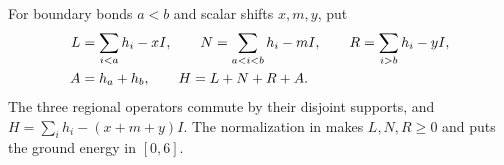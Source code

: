 \begin{definition}
    \label{def:aklv_normalized_cut_blocks}
    \leanok
    For boundary bonds $a<b$ and scalar shifts $x,m,y$, put
    \begin{align}
        L & =\sum_{i<a}h_i-xI,\qquad
        N=\sum_{a<i<b}h_i-mI,\qquad
        R=\sum_{i>b}h_i-yI,\notag      \\
        A & =h_a+h_b,\qquad H=L+N+R+A.
    \end{align}
    The three regional operators commute by their disjoint supports, and
    $H=\sum_i h_i-(x+m+y)I$.
    The normalization in \cite[Section~6.1]{Arad2013AreaLaw} makes
    $L,N,R\ge0$ and puts the ground energy in $[0,6]$.
\end{definition}

